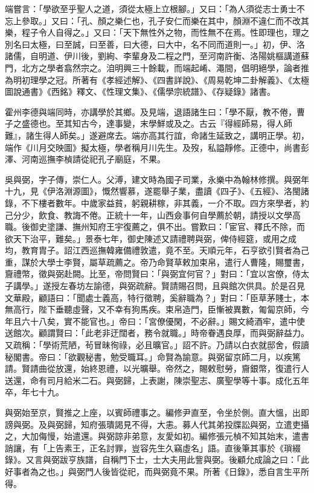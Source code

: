 \begin{pinyinscope}
端嘗言：「學欲至乎聖人之道，須從太極上立根腳。」又曰：「為人須從志士勇士不忘上參取。」又曰：「孔、顏之樂仁也，孔子安仁而樂在其中，顏淵不違仁而不改其樂，程子令人自得之。」又曰：「天下無性外之物，而性無不在焉。性即理也，理之別名曰太極，曰至誠，曰至善，曰大德，曰大中，名不同而道則一。」初，伊、洛諸儒，自明道、伊川後，劉絢、李輩身及二程之門，至河南許衡、洛陽姚樞講道蘇門，北方之學者翕然宗之。洎明興三十餘載，而端起崤、澠間，倡明絕學，論者推為明初理學之冠。所著有《孝經述解》、《四書詳說》、《周易乾坤二卦解義》、《太極圖說通書》《西銘》釋文、《性理文集》、《儒學宗統譜》、《存疑錄》諸書。

霍州李德與端同時，亦講學於其鄉。及見端，退語諸生曰：「學不厭，教不倦，曹子之盛德也。至其知古今，達事變，末學鮮或及之。古云『得經師易，得人師難』，諸生得人師矣。」遂避席去。端亦高其行誼，命諸生延致之，講明正學。初，端作《川月交映圖》擬太極，學者稱月川先生。及歿，私謚靜修。正德中，尚書彭澤、河南巡撫李楨請從祀孔子廟庭，不果。

吳與弼，字子傳，崇仁人。父溥，建文時為國子司業，永樂中為翰林修撰。與弼年十九，見《伊洛淵源圖》，慨然響慕，遂罷舉子業，盡讀《四子》、《五經》、洛閩諸錄，不下樓者數年。中歲家益貧，躬親耕稼，非其義，一介不取。四方來學者，約己分少，飲食、教誨不倦。正統十一年，山西僉事何自學薦於朝，請授以文學高職。後御史塗謙、撫州知府王宇復薦之，俱不出。嘗歎曰：「宦官、釋氏不除，而欲天下治平，難矣。」景泰七年，御史陳述又請禮聘與弼，俾侍經筵，或用之成均，教育胄子。詔江西巡撫韓雍備禮敦遣，竟不至。天順元年，石亨欲引賢者為己重，謀於大學士李賢，屬草疏薦之。帝乃命賢草敕加束帛，遣行人曹隆，賜璽書，齎禮幣，徵與弼赴闕。比至，帝問賢曰：「與弼宜何官？」對曰：「宜以宮僚，侍太子講學。」遂授左春坊左諭德，與弼疏辭。賢請賜召問，且與館次供具。於是召見文華殿，顧語曰：「聞處士義高，特行徵聘，奚辭職為？」對曰：「臣草茅賤士，本無高行，陛下垂聽虛聲，又不幸有狗馬疾。束帛造門，臣慚被異數，匍匐京師，今年且六十八矣，實不能官也。」帝曰：「宮僚優閑，不必辭。」賜文綺酒牢，遣中使送館次。顧謂賢曰：「此老非迂闊者，務令就職。」時帝眷遇良厚，而與弼辭益力。又疏稱：「學術荒陋，茍冒昧徇祿，必且曠官。」詔不許。乃請以白衣就邸舍，假讀秘閣書。帝曰：「欲觀秘書，勉受職耳。」命賢為諭意。與弼留京師二月，以疾篤請。賢請曲從放還，始終恩禮，以光曠舉。帝然之，賜敕慰勞，齎銀幣，復遣行人送還，命有司月給米二石。與弼歸，上表謝，陳崇聖志、廣聖學等十事。成化五年卒，年七十九。

與弼始至京，賢推之上座，以賓師禮事之。編修尹直至，令坐於側。直大慍，出即謗與弼。及與弼歸，知府張璝謁見不得，大恚。募人代其弟投牒訟與弼，立遣吏攝之，大加侮慢，始遣還。與弼諒非弟意，友愛如初。編修張元楨不知其始末，遣書誚讓，有「上告素王，正名討罪，豈容先生久竊虛名」語。直後筆其事於《瑣綴錄》。又言與弼跋亨族譜，自稱門下士，士大夫用此訾與弼。後顧允成論之曰：「此好事者為之也。」與弼門人後皆從祀，而與弼竟不果。所著《日錄》，悉自言生平所得。


\end{pinyinscope}
